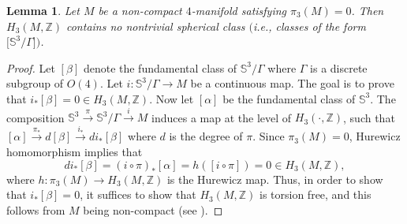 \documentclass[10pt,a4paper]{amsart}
\numberwithin{equation}{section}
\newtheorem{Lemma}[Theorem]{Lemma}
\def\S{\mathbb{S}}
\def\Z{\mathbb{Z}}
\begin{document}
\begin{Lemma}\label{topLemma}
	Let $M$ be a non-compact $4$-manifold satisfying $\pi_3(M) = 0$. Then
	$H_3(M,\Z)$ contains no nontrivial spherical class $($i.e., classes of the form
	$\bigl[\S^3/\Gamma\bigr])$.
\end{Lemma}
\begin{proof}
	Let $[\beta]$ denote the fundamental class of $\S^3/\Gamma$
	where $\Gamma$ is a discrete subgroup of $O(4)$. Let $i\colon \S^3/\Gamma\rightarrow M$ be a continuous map. The goal is
	to prove that $i_*[\beta] = 0\in H_3(M,\Z)$. Now let $[\alpha]$
	be the fundamental class of $\S^3$. The composition
	$\S^3\xrightarrow{\pi}\S^3/\Gamma\xrightarrow{i} M$ induces a
	map at the level of $H_3(\cdot, \Z)$, such that
	$[\alpha]\xrightarrow{\pi_*} d[\beta] \xrightarrow{i_*}di_*[\beta]$
	where $d$ is the degree of $\pi$. Since $\pi_3(M) = 0$, Hurewicz homomorphism
	implies that \[
		di_*[\beta] = (i\circ\pi)_*[\alpha] = h([i\circ\pi])= 0\in H_3(M,\Z),
	\]
	where $h\colon \pi_3(M)\rightarrow H_3(M,\Z)$ is the Hurewicz map. Thus,
	in order to show that $i_*[\beta] = 0$, it suffices to show that
	$H_3(M,\Z)$ is torsion free, and this follows from $M$ being non-compact
	(see \cite[Corollary~7.12]{bredon}).
\end{proof}
\end{document}
